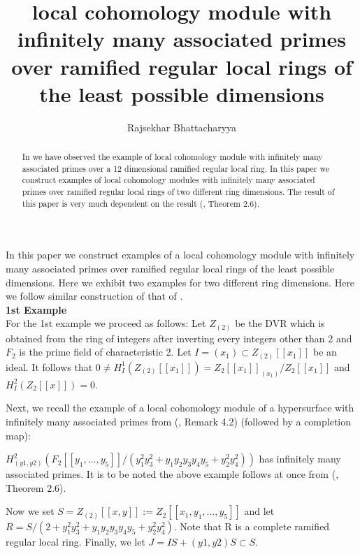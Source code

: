 \documentclass[10pt]{amsart}
\title[]{local cohomology module with infinitely many associated primes over ramified regular local rings of the least possible dimensions}
\author[]{Rajsekhar Bhattacharyya}
\theoremstyle{plain}
\theoremstyle{definition}
\begin{document}
\begin{abstract}
In \cite{Ma} we have observed the example of local cohomology module with infinitely many associated primes over a 12 dimensional ramified regular local ring. In this paper we construct examples of local cohomology modules with infinitely many associated primes over ramified regular local rings of two different ring dimensions. The result of this paper is very much dependent on the result (\cite{SS}, Theorem 2.6). 
\end{abstract}

\maketitle




\section{}
In this paper we construct examples of a local cohomology module with infinitely many associated primes over ramified regular local rings of the least possible dimensions. Here we exhibit two examples for two different ring dimensions. Here we follow similar construction of that of \cite{Ma}.\\

{\bf 1st Example}\\

For the 1st example we proceed as follows: Let $Z_{(2)}$ be the DVR which is obtained from the ring of integers after inverting every integers other than 2 and $F_2$ is the prime field of characteristic 2. Let $I=(x_1) \subset Z_{(2)}[[x_1]]$ be an ideal.
It follows that
$0\neq H^1_I (Z_{(2)}[[x_1]]) =Z_2[[x_1]]_{(x_1)}/Z_2[[x_1]]$ and $H^2_I (Z_2[[x]]) = 0.$

Next, we recall the example of a local cohomology module of a hypersurface with infinitely many
associated primes from (\cite{SS}, Remark 4.2) (followed by a
completion map):

$H^2_{(y1,y2)} (F_2[[y_1,\ldots, y_5]]/(y^2_1 y^2
_3  + y_1y_2y_3y_4y_5 + y^2_2 y^2_4 ))
$
has infinitely many associated primes. It is to be noted the above example follows at once from (\cite{SS}, Theorem 2.6). 

Now we set $S = Z_{(2)}[[x, y]] := Z_2[[x_1, y_1,\ldots, y_5]]$ and let
$R = S/(2 + y^2_1 y^2
_3 + y_1y_2y_3y_4y_5 + y^2_2 y^2_4)$.
Note that R is a complete ramified regular local ring. Finally, we let
$J = IS + (y1, y2)S\subset S$.
\end{document}
